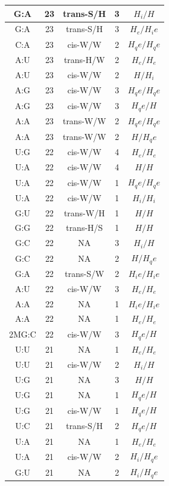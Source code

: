 \begin{center}
\begin{longtable}{c|c|c|c|c}
G:A & 23 & trans-S/H & 3 & $H_i/H$ \\  \hline
G:A & 23 & trans-S/H & 3 & $H_e/H_ie$ \\  \hline
C:A & 23 & cis-W/W & 2 & $H_qe/H_qe$ \\  \hline
A:U & 23 & trans-H/W & 2 & $H_e/H_e$ \\  \hline
A:U & 23 & cis-W/W & 2 & $H/H_i$ \\  \hline
A:G & 23 & cis-W/W & 3 & $H_qe/H_qe$ \\  \hline
A:G & 23 & cis-W/W & 3 & $H_qe/H$ \\  \hline
A:A & 23 & trans-W/W & 2 & $H_qe/H_qe$ \\  \hline
A:A & 23 & trans-W/W & 2 & $H/H_qe$ \\  \hline
U:G & 22 & cis-W/W & 4 & $H_e/H_e$ \\  \hline
U:A & 22 & cis-W/W & 4 & $H/H$ \\  \hline
U:A & 22 & cis-W/W & 1 & $H_qe/H_qe$ \\  \hline
U:A & 22 & cis-W/W & 1 & $H_i/H_i$ \\  \hline
G:U & 22 & trans-W/H & 1 & $H/H$ \\  \hline
G:G & 22 & trans-H/S & 1 & $H/H$ \\  \hline
G:C & 22 & NA & 3 & $H_i/H$ \\  \hline
G:C & 22 & NA & 2 & $H/H_qe$ \\  \hline
G:A & 22 & trans-S/W & 2 & $H_ie/H_ie$ \\  \hline
A:U & 22 & cis-W/W & 3 & $H_e/H_e$ \\  \hline
A:A & 22 & NA & 1 & $H_ie/H_ie$ \\  \hline
A:A & 22 & NA & 1 & $H_e/H_e$ \\  \hline
2MG:C & 22 & cis-W/W & 3 & $H_qe/H$ \\  \hline
U:U & 21 & NA & 1 & $H_e/H_e$ \\  \hline
U:U & 21 & cis-W/W & 2 & $H_i/H$ \\  \hline
U:G & 21 & NA & 3 & $H/H$ \\  \hline
U:G & 21 & NA & 1 & $H_qe/H$ \\  \hline
U:G & 21 & cis-W/W & 1 & $H_qe/H$ \\  \hline
U:C & 21 & trans-S/H & 2 & $H_qe/H$ \\  \hline
U:A & 21 & NA & 1 & $H_e/H_e$ \\  \hline
U:A & 21 & cis-W/W & 2 & $H_i/H_qe$ \\  \hline
G:U & 21 & NA & 2 & $H_i/H_qe$ \\  \hline

\end{longtable}
\end{center}
